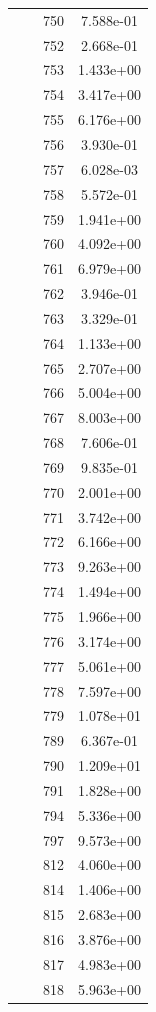 \documentclass[12pt]{article}
\begin{document}
\begin{longtable}{@{}cccc@{}}
 &  & 750 & 7.588e-01 \\
 &  & 752 & 2.668e-01 \\
 &  & 753 & 1.433e+00 \\
 &  & 754 & 3.417e+00 \\
 &  & 755 & 6.176e+00 \\
 &  & 756 & 3.930e-01 \\
 &  & 757 & 6.028e-03 \\
 &  & 758 & 5.572e-01 \\
 &  & 759 & 1.941e+00 \\
 &  & 760 & 4.092e+00 \\
 &  & 761 & 6.979e+00 \\
 &  & 762 & 3.946e-01 \\
 &  & 763 & 3.329e-01 \\
 &  & 764 & 1.133e+00 \\
 &  & 765 & 2.707e+00 \\
 &  & 766 & 5.004e+00 \\
 &  & 767 & 8.003e+00 \\
 &  & 768 & 7.606e-01 \\
 &  & 769 & 9.835e-01 \\
 &  & 770 & 2.001e+00 \\
 &  & 771 & 3.742e+00 \\
 &  & 772 & 6.166e+00 \\
 &  & 773 & 9.263e+00 \\
 &  & 774 & 1.494e+00 \\
 &  & 775 & 1.966e+00 \\
 &  & 776 & 3.174e+00 \\
 &  & 777 & 5.061e+00 \\
 &  & 778 & 7.597e+00 \\
 &  & 779 & 1.078e+01 \\
 &  & 789 & 6.367e-01 \\
 &  & 790 & 1.209e+01 \\
 &  & 791 & 1.828e+00 \\
 &  & 794 & 5.336e+00 \\
 &  & 797 & 9.573e+00 \\
 &  & 812 & 4.060e+00 \\
 &  & 814 & 1.406e+00 \\
 &  & 815 & 2.683e+00 \\
 &  & 816 & 3.876e+00 \\
 &  & 817 & 4.983e+00 \\
 &  & 818 & 5.963e+00 \\

\end{longtable}
\end{document}

